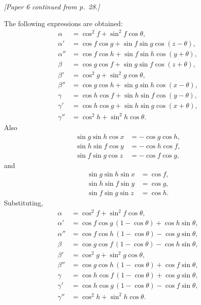\documentclass[11pt]{article}
\begin{document}
\setlength{\parindent}{1.5em}


\noindent\textit{[Paper 6 continued from p.~28.]}

\medskip

\noindent The following expressions are obtained:
\[
\begin{aligned}
\alpha   &= \cos^2 f + \sin^2 f \cos\theta, \\
\alpha'  &= \cos f \cos g + \sin f \sin g \cos(z-\theta), \\
\alpha'' &= \cos f \cos h + \sin f \sin h \cos(y+\theta), \\
\beta    &= \cos g \cos f + \sin g \sin f \cos(z+\theta), \\
\beta'   &= \cos^2 g + \sin^2 g \cos\theta, \\
\beta''  &= \cos g \cos h + \sin g \sin h \cos(x-\theta), \\
\gamma   &= \cos h \cos f + \sin h \sin f \cos(y-\theta), \\
\gamma'  &= \cos h \cos g + \sin h \sin g \cos(x+\theta), \\
\gamma'' &= \cos^2 h + \sin^2 h \cos\theta.
\end{aligned}
\]
Also
\[
\begin{aligned}
\sin g \sin h \cos x &= -\cos g \cos h, \\
\sin h \sin f \cos y &= -\cos h \cos f, \\
\sin f \sin g \cos z &= -\cos f \cos g,
\end{aligned}
\]
and
\[
\begin{aligned}
\sin g \sin h \sin x &= \cos f, \\
\sin h \sin f \sin y &= \cos g, \\
\sin f \sin g \sin z &= \cos h.
\end{aligned}
\]
Substituting,
\[
\begin{aligned}
\alpha   &= \cos^2 f + \sin^2 f \cos\theta, \\
\alpha'  &= \cos f \cos g\,(1-\cos\theta) + \cos h \sin\theta, \\
\alpha'' &= \cos f \cos h\,(1-\cos\theta) - \cos g \sin\theta, \\
\beta    &= \cos g \cos f\,(1-\cos\theta) - \cos h \sin\theta, \\
\beta'   &= \cos^2 g + \sin^2 g \cos\theta, \\
\beta''  &= \cos g \cos h\,(1-\cos\theta) + \cos f \sin\theta, \\
\gamma   &= \cos h \cos f\,(1-\cos\theta) + \cos g \sin\theta, \\
\gamma'  &= \cos h \cos g\,(1-\cos\theta) - \cos f \sin\theta, \\
\gamma'' &= \cos^2 h + \sin^2 h \cos\theta.
\end{aligned}
\]
\end{document}
